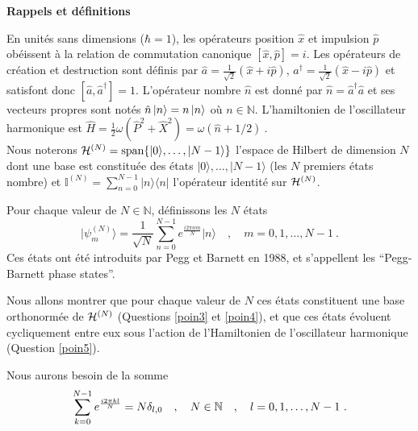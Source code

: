 {\bf Rappels et définitions}

 En unités sans dimensions ($\hbar=1$), les opérateurs position $\hat x$ et impulsion $\hat p$ obéissent à la relation de commutation canonique $[\hat x, \hat p]=i $.  Les opérateurs de création et destruction sont définis par 
$\hat a= \frac{1}{\sqrt{2}}(\hat x+i\hat p)$, $a^\dagger= \frac{1}{\sqrt{2}}(\hat x-i\hat p)$ et satisfont donc $[\hat a,\hat a^\dagger]=1$. L'opérateur nombre $\hat n$ est donné par $\hat n= \hat a^\dagger \hat a$ et ses vecteurs propres sont notés $\hat n \ket{n} =n \ket{n}$ où $n \in \mathbb{N}$. 
L'hamiltonien de l'oscillateur harmonique est $\hat H = \frac{1}{2}\omega ( \hat P^2 + \hat X^2 ) = \omega (\hat n + 1/2)\ $. \\



Nous noterons ${\cal H}^{(N)}={\text{span}}\{\lvert 0\rangle, \dotsc, \lvert N-1\rangle\}$ l'espace de Hilbert de dimension $N$ dont une base est constituée des états 
$\lvert 0\rangle, \dotsc, \lvert N-1\rangle$ (les $N$ premiers états nombre)
et $\mathbb{I}^{(N)} =\sum_{n=0}^{N-1} \lvert n \rangle \langle n \rvert$ l'opérateur identité sur ${\cal H}^{(N)}$.


Pour chaque valeur de $N\in \mathbb{N}$, définissons les $N$ états
\begin{equation}
\lvert \psi^{(N)}_m\rangle = \frac{1}{\sqrt{N}} \sum_{n=0}^{N-1} e^{\frac{i 2 \pi  nm}{N}} \lvert n \rangle\quad , \quad m=0,1,\dotsc,N-1\ .
\label{eq:states}
\end{equation}
Ces états ont été introduits par Pegg et Barnett en 1988, et s'appellent les ``Pegg-Barnett phase states''.

Nous allons montrer que pour chaque valeur de $N$ ces états constituent une base orthonormée de ${\cal H}^{(N)}$ (Questions \ref{poin3} et \ref{poin4}), et que ces états évoluent cycliquement entre eux sous l'action de l'Hamiltonien de l'oscillateur harmonique (Question \ref{poin5}).


Nous aurons besoin de la somme 
\begin{equation}
\sum_{k=0}^{N-1} e^{\frac{i 2 \pi  k l}{N}}=N\delta_{l,0} \quad , \quad N\in \mathbb{N}  \quad , \quad  l=0,1,\dotsc,N-1\ .\\
\label{eq:sum}
\end{equation}


